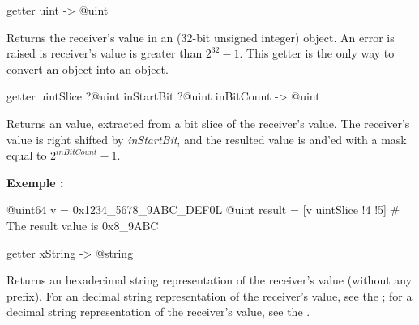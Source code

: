 
\begin{galgas}
getter uint -> @uint
\end{galgas}

Returns the receiver's value in an  (32-bit unsigned integer) object. An error is raised is receiver's value is greater than $2^{32}-1$. This getter is the only way to convert an  object into an  object.



\begin{galgas}
getter uintSlice ?@uint inStartBit ?@uint inBitCount -> @uint
\end{galgas}



Returns an  value, extracted from a bit slice of the receiver's value. The receiver's value is right shifted by \emph{inStartBit}, and the resulted value is and'ed with a mask equal to $2^{inBitCount}-1$.


\textbf{Exemple :}
\begin{galgas}
@uint64 v = 0x1234_5678_9ABC_DEF0L
@uint result = [v uintSlice !4 !5] # The result value is 0x8_9ABC
\end{galgas}






\begin{galgas}
getter xString -> @string
\end{galgas}

Returns an hexadecimal string representation of the receiver's value (without any prefix). For an decimal string representation of the receiver's value, see the ; for a decimal string representation of the receiver's value, see the .










